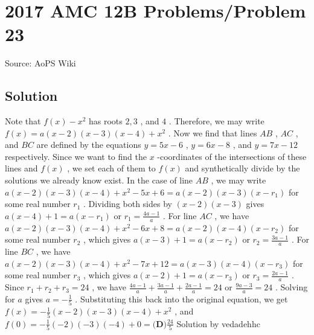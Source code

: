 \documentclass[12pt]{article}
\begin{document}
\section*{{2017 AMC 12B Problems/Problem 23}}
Source: AoPS Wiki

\subsection*{Solution}
Note that $f(x) - x^2$ has roots $2, 3$ , and $4$ . Therefore, we may write $f(x) = a(x-2)(x-3)(x-4) +x^2$ . Now we find that lines $AB$ , $AC$ , and $BC$ are defined by the equations $y = 5x - 6$ , $y= 6x-8$ , and $y=7x-12$ respectively. Since we want to find the $x$ -coordinates of the intersections of these lines and $f(x)$ , we set each of them to $f(x)$ and synthetically divide by the solutions we already know exist. In the case of line $AB$ , we may write $a(x-2)(x-3)(x-4)+x^2-5x+6 = a(x-2)(x-3)(x-r_1)$ for some real number $r_1$ . Dividing both sides by $(x-2)(x-3)$ gives $a(x-4)+1 = a(x-r_1)$ or $r_1 = \frac {4a-1}{a}$ . For line $AC$ , we have $a(x-2)(x-3)(x-4)+x^2-6x+8 = a(x-2)(x-4)(x-r_2)$ for some real number $r_2$ , which gives $a(x-3)+1 = a(x-r_2)$ or $r_2 = \frac {3a-1}{a}$ . For line $BC$ , we have $a(x-2)(x-3)(x-4)+x^2-7x+12 = a(x-3)(x-4)(x-r_3)$ for some real number $r_3$ , which gives $a(x-2)+1 = a(x-r_3)$ or $r_3 = \frac {2a-1}{a}$ . Since $r_1 + r_2 + r_3 = 24$ , we have $\frac {4a-1}{a} + \frac {3a-1}{a} + \frac {2a-1}{a} = 24$ or $\frac {9a-3}{a} = 24$ . Solving for $a$ gives $a = - \frac{1}{5}$ . Substituting this back into the original equation, we get $f(x) = -\frac{1}{5}(x-2)(x-3)(x-4) + x^2$ , and $f(0) = -\frac{1}{5}(-2)(-3)(-4) + 0 = \boxed{\textbf{(D)}\frac{24}{5}}$ Solution by vedadehhc
\end{document}
